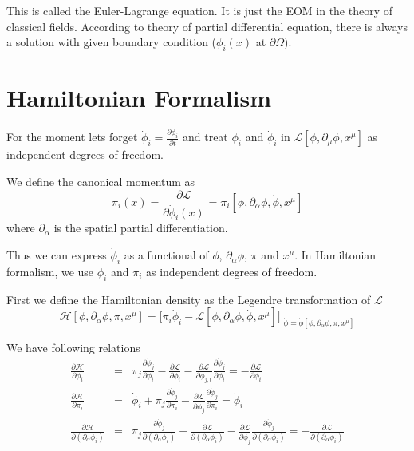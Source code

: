 \documentclass[12pt]{book}
\begin{document}
	This is called the Euler-Lagrange equation. It is just the EOM in the theory of classical fields. According to theory of partial differential equation, there is always a solution with given boundary condition ($\phi_i(x)$ at $\partial\Omega$).
	
	\section{Hamiltonian Formalism}
	
	For the moment lets forget $\dot\phi_i=\frac{\partial\phi_i}{\partial t}$ and treat $\phi_i$ and $\dot\phi_i$ in $\mathcal{L}[\phi,\partial_\mu\phi,x^\mu]$ as independent degrees of freedom. 
	
	We define the canonical momentum as
	\begin{equation}
		\pi_i(x)=\frac{\partial\mathcal{L}}{\partial\dot\phi_i(x)}=\pi_i[\phi,\partial_\alpha\phi,\dot\phi,x^\mu] \label{eqn:canonical-momentum}
	\end{equation}
	where $\partial_\alpha$ is the spatial partial differentiation.
	
	Thus we can express $\dot\phi_i$ as a functional of $\phi$, $\partial_\alpha\phi$, $\pi$ and $x^\mu$. In Hamiltonian formalism, we use $\phi_i$ and $\pi_i$ as independent degrees of freedom.
	
	First we define the Hamiltonian density as the Legendre transformation of $\mathcal{L}$
	\begin{equation}
		\mathcal{H}[\phi,\partial_\alpha\phi,\pi,x^\mu]=\big[\pi_i\dot\phi_i -\mathcal{L}[\phi,\partial_\alpha\phi,\dot\phi,x^\mu]\big]\big|_{\dot\phi=\dot\phi[\phi,\partial_\alpha\phi,\pi,x^\mu]}
	\end{equation}
	
	We have following relations
	\begin{eqnarray}
		\frac{\partial\mathcal{H}}{\partial\phi_i}&=&\pi_j\frac{\partial\dot\phi_j}{\partial\phi_i}-\frac{\partial\mathcal{L}}{\partial\phi_i}-\frac{\partial\mathcal{L}}{\partial\phi_{j,t}}\frac{\partial\dot\phi_j}{\partial\phi_i}=-\frac{\partial\mathcal{L}}{\partial\phi_i}\\
		\frac{\partial\mathcal{H}}{\partial\pi_i}&=&\dot\phi_i+\pi_j\frac{\partial\dot\phi_j}{\partial\pi_i}-\frac{\partial\mathcal{L}}{\partial\dot\phi_j}\frac{\partial\dot\phi_j}{\partial\pi_i}=\dot\phi_i\\
		\frac{\partial\mathcal{H}}{\partial(\partial_\alpha\phi_i)}&=&\pi_j\frac{\partial\dot\phi_j}{\partial(\partial_\alpha\phi_i)}-\frac{\partial\mathcal{L}}{\partial(\partial_\alpha\phi_i)}-\frac{\partial\mathcal{L}}{\partial\dot\phi_j}\frac{\partial\dot\phi_j}{\partial(\partial_\alpha\phi_i)}=-\frac{\partial\mathcal{L}}{\partial(\partial_\alpha\phi_i)}
	\end{eqnarray}
	
\end{document}
